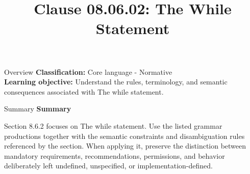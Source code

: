 \documentclass[10pt,letterpaper]{article}
\title{Clause 08.06.02: The While Statement}
\author{}
\date{}
\begin{document}
\maketitle
\begin{CornellOverviewBox}{Overview}
\textbf{Classification:} Core language - Normative\\[2pt]
\textbf{Learning objective:} Understand the rules, terminology, and semantic consequences associated with The while statement.
\end{CornellOverviewBox}\begin{CornellSummaryBox}{Summary}
{\sffamily\bfseries\color{Accent} Summary}\par\vspace{3pt}Section 8.6.2 focuses on The while statement. Use the listed grammar productions together with the semantic constraints and disambiguation rules referenced by the section. When applying it, preserve the distinction between mandatory requirements, recommendations, permissions, and behavior deliberately left undefined, unspecified, or implementation-defined.
\end{CornellSummaryBox}
\end{document}
